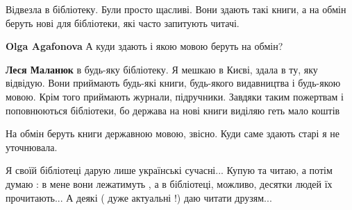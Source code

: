  
Відвезла в бібліотеку. Були просто щасливі. Вони здають такі книги, а на обмін беруть нові для бібліотеки, які часто запитують читачі.

\begin{itemize}
 
\textbf{Olga Agafonova} А куди здають і якою мовою беруть на обмін?

 
\textbf{Леся Маланюк} в будь-яку бібліотеку. Я мешкаю в Києві, здала в ту, яку відвідую. Вони приймають будь-які книги, будь-якого видавництва і будь-якою мовою. Крім того приймають журнали, підручники. Завдяки таким пожертвам і поповнюються бібліотеки, бо держава на нові книги виділяю геть мало коштів

 
На обмін беруть книги державною мовою, звісно. Куди саме здають старі я не уточнювала.

 

Я своїй бібліотеці дарую лише українські сучасні... Купую та читаю, а потім
думаю : в мене вони лежатимуть , а в бібліотеці, можливо, десятки людей їх
прочитають... А деякі ( дуже актуальні !) даю читати друзям...

\end{itemize}

